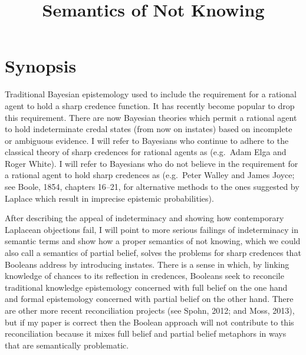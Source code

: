\documentclass[11pt]{article}
\begin{document}
\doublespacing
{}

\title{Semantics of Not Knowing}
\date{}
\maketitle


\section{Synopsis}
\label{Synopsis}

Traditional Bayesian epistemology used to include the requirement for
a rational agent to hold a sharp credence function. It has recently
become popular to drop this requirement. There are now Bayesian
theories which permit a rational agent to hold indeterminate credal
states (from now on instates) based on incomplete or ambiguous
evidence. I will refer to Bayesians who continue to adhere to the
classical theory of sharp credences for rational agents as
 (e.g.\ Adam Elga and Roger White). I will refer to
Bayesians who do not believe in the requirement for a rational agent
to hold sharp credences as  (e.g.\ Peter Walley and
James Joyce; see Boole, 1854, chapters 16--21, for alternative methods
to the ones suggested by Laplace which result in imprecise epistemic
probabilities).

After describing the appeal of indeterminacy and showing how
contemporary Laplacean objections fail, I will point to more serious
failings of indeterminacy in semantic terms and show how a proper
semantics of not knowing, which we could also call a semantics of
partial belief, solves the problems for sharp credences that Booleans
address by introducing instates. There is a sense in which, by linking
knowledge of chances to its reflection in credences, Booleans seek to
reconcile traditional knowledge epistemology concerned with full
belief on the one hand and formal epistemology concerned with partial
belief on the other hand. There are other more recent reconciliation
projects (see Spohn, 2012; and Moss, 2013), but if my paper is correct
then the Boolean approach will not contribute to this reconciliation
because it mixes full belief and partial belief metaphors in ways that
are semantically problematic.
\end{document}
